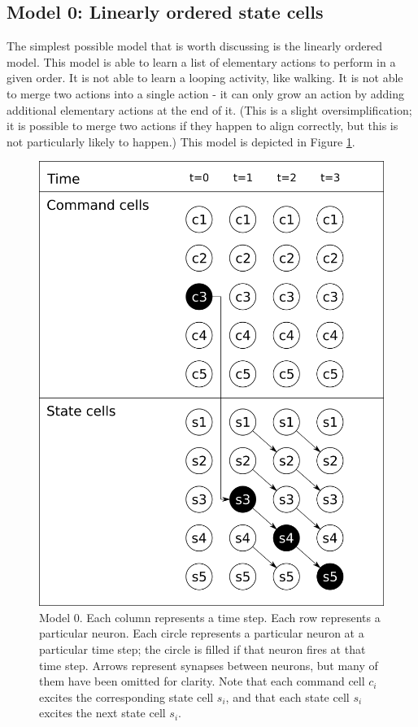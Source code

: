 \documentclass{article}
\theoremstyle{definition}
\begin{document}
\subsection{Model 0: Linearly ordered state cells}

The simplest possible model that is worth discussing is the linearly
ordered model. This model is able to learn a list of elementary
actions to perform in a given order. It is not able to learn a looping
activity, like walking. It is not able to merge two actions into a
single action - it can only grow an action by adding additional
elementary actions at the end of it. (This is a slight
oversimplification; it is possible to merge two actions if they happen
to align correctly, but this is not particularly likely to happen.)
This model is depicted in Figure \ref{fig-model0}.

\begin{figure}
\includegraphics[width=\linewidth]{positive_model0.png}
\caption{Model 0. Each column represents a time step. Each row
  represents a particular neuron. Each circle represents a particular
  neuron at a particular time step; the circle is filled if that
  neuron fires at that time step. Arrows represent synapses between
  neurons, but many of them have been omitted for clarity. Note that
  each command cell $c_i$ excites the corresponding state cell $s_i$,
  and that each state cell $s_i$ excites the next state cell $s_i$.}
\label{fig-model0}
\end{figure}
\end{document}
